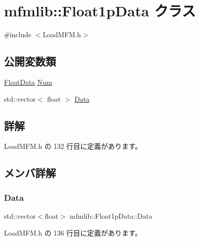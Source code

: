 \hypertarget{classmfmlib_1_1_float1p_data}{}\section{mfmlib\+:\+:Float1p\+Data クラス}
\label{classmfmlib_1_1_float1p_data}


{\ttfamily \#include $<$Load\+M\+F\+M.\+h$>$}

\subsection*{公開変数類}
\begin{DoxyCompactItemize}
\item 
\mbox{\hyperlink{classmfmlib_1_1_float_data}{Float\+Data}} \mbox{\hyperlink{classmfmlib_1_1_float1p_data_a6672d2c3f3e05965772b92524f27db15}{Num}}
\item 
std\+::vector$<$ float $>$ \mbox{\hyperlink{classmfmlib_1_1_float1p_data_adb6b956878dc0346e374bb89f74c10fd}{Data}}
\end{DoxyCompactItemize}


\subsection{詳解}


 Load\+M\+F\+M.\+h の 132 行目に定義があります。



\subsection{メンバ詳解}
\mbox{\label{classmfmlib_1_1_float1p_data_adb6b956878dc0346e374bb89f74c10fd}} 
\subsubsection{\texorpdfstring{Data}{Data}}
{\footnotesize\ttfamily std\+::vector$<$float$>$ mfmlib\+::\+Float1p\+Data\+::\+Data}



 Load\+M\+F\+M.\+h の 136 行目に定義があります。

\mbox{\label{classmfmlib_1_1_float1p_data_a6672d2c3f3e05965772b92524f27db15}} 

